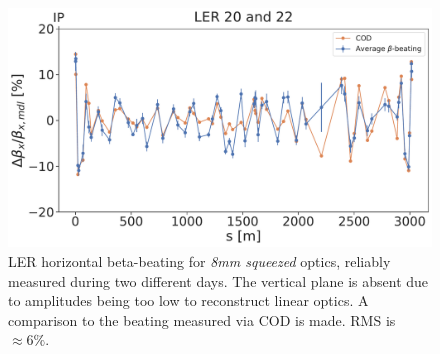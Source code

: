 \begin{figure}[!htb]
    \centering
    \includegraphics[width=0.7\linewidth]{images/kek/ler_20_22_bet_x.pdf}
    \caption{LER horizontal beta-beating for \textit{8mm squeezed} optics, reliably measured during
    two different days. The vertical plane is absent due to amplitudes being too low to reconstruct
    linear optics. A comparison to the beating measured via COD is made. RMS is $\approx 6\%$.}
    \label{fig:kek:beating_ler_squeezed}
\end{figure}



